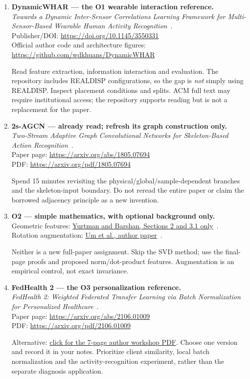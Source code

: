 \documentclass[10pt]{article}
\begin{document}
\begin{enumerate}[label=\textbf{\arabic*.},itemsep=7pt]
\item \textbf{DynamicWHAR --- the O1 wearable interaction reference.}\\
\emph{Towards a Dynamic Inter-Sensor Correlations Learning Framework for Multi-Sensor-Based Wearable Human Activity Recognition}~\cite{omdynamic}.\\
Publisher/DOI: \url{https://doi.org/10.1145/3550331}\\
Official author code and architecture figures: \url{https://github.com/wdkhuans/DynamicWHAR}\par
Read feature extraction, information interaction and evaluation. The repository includes REALDISP configurations, so the gap is \emph{not} simply using REALDISP. Inspect placement conditions and splits. ACM full text may require institutional access; the repository supports reading but is not a replacement for the paper.

\item \textbf{2s-AGCN --- already read; refresh its graph construction only.}\\
\emph{Two-Stream Adaptive Graph Convolutional Networks for Skeleton-Based Action Recognition}~\cite{omagcn}.\\
Paper page: \url{https://arxiv.org/abs/1805.07694}\\
PDF: \url{https://arxiv.org/pdf/1805.07694}\par
Spend 15 minutes revisiting the physical/global/sample-dependent branches and the skeleton-input boundary. Do not reread the entire paper or claim the borrowed adjacency principle as a new invention.

\item \textbf{O2 --- simple mathematics, with optional background only.}\\
Geometric features: \href{https://doi.org/10.3390/s17102222}{Yurtman and Barshan, Sections 2 and 3.1 only}~\cite{omyurtman}.\\
Rotation augmentation: \href{https://arxiv.org/abs/1706.00527}{Um et al., author paper}~\cite{omum}.\par
Neither is a new full-paper assignment. Skip the SVD method; use the final-page proofs and proposed norm/dot-product features. Augmentation is an empirical control, not exact invariance.

\item \textbf{FedHealth 2 --- the O3 personalization reference.}\\
\emph{FedHealth 2: Weighted Federated Transfer Learning via Batch Normalization for Personalized Healthcare}~\cite{omfedhealth}.\\
Paper page: \url{https://arxiv.org/abs/2106.01009}\\
PDF: \url{https://arxiv.org/pdf/2106.01009}\par
Alternative: \href{https://federated-learning.org/fl-ijcai-2021/FTL-IJCAI21_paper_4.pdf}{click for the 7-page author workshop PDF}. Choose one version and record it in your notes. Prioritize client similarity, local batch normalization and the activity-recognition experiment, rather than the separate diagnosis application.


\end{enumerate}
\end{document}
